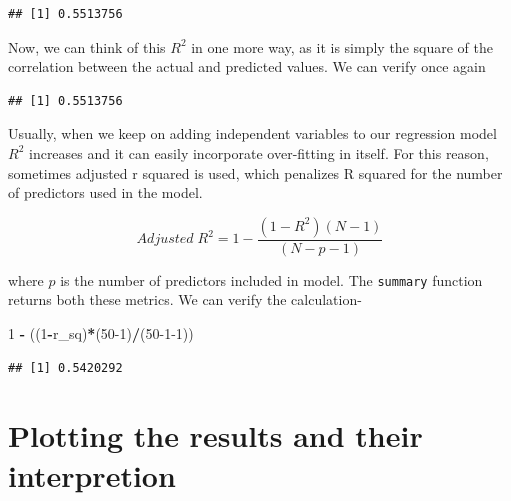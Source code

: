 \documentclass[
]{book}
\newenvironment{Shaded}{\begin{snugshade}}{\end{snugshade}}
\newcommand{\DecValTok}[1]{\textcolor[rgb]{0.00,0.00,0.81}{#1}}
\newcommand{\FunctionTok}[1]{\textcolor[rgb]{0.13,0.29,0.53}{\textbf{#1}}}
\newcommand{\NormalTok}[1]{#1}
\newcommand{\SpecialCharTok}[1]{\textcolor[rgb]{0.81,0.36,0.00}{\textbf{#1}}}
\newcommand{\StringTok}[1]{\textcolor[rgb]{0.31,0.60,0.02}{#1}}
\begin{document}
\begin{verbatim}
## [1] 0.5513756
\end{verbatim}

Now, we can think of this \(R^2\) in one more way, as it is simply the square of the correlation between the actual and predicted values. We can verify once again

\begin{Shaded}
\end{Shaded}

\begin{verbatim}
## [1] 0.5513756
\end{verbatim}

Usually, when we keep on adding independent variables to our regression model \(R^2\) increases and it can easily incorporate over-fitting in itself. For this reason, sometimes adjusted r squared is used, which penalizes R squared for the number of predictors used in the model.

\begin{equation} 
{Adjusted}\;{ R^2} = 1 - \frac{(1-R^2)(N - 1)}{(N - p - 1)}
\label{eq:lr11}
\end{equation}

where \(p\) is the number of predictors included in model. The \texttt{summary} function returns both these metrics. We can verify the calculation-

\begin{Shaded}
\begin{Highlighting}[]
\DecValTok{1} \SpecialCharTok{{-}}\NormalTok{ ((}\DecValTok{1}\SpecialCharTok{{-}}\NormalTok{r\_sq)}\SpecialCharTok{*}\NormalTok{(}\DecValTok{50{-}1}\NormalTok{)}\SpecialCharTok{/}\NormalTok{(}\DecValTok{50{-}1{-}1}\NormalTok{))}
\end{Highlighting}
\end{Shaded}

\begin{verbatim}
## [1] 0.5420292
\end{verbatim}

\hypertarget{plotting-the-results-and-their-interpretion}{%
\section{Plotting the results and their interpretion}\label{plotting-the-results-and-their-interpretion}}
\end{document}
